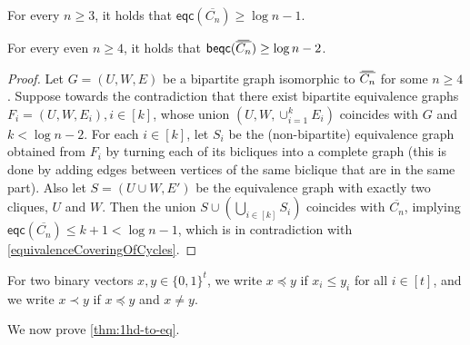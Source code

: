 \documentclass{theoretics}
\newcommand{\eqc}{\mathsf{eqc}}
\newcommand{\beqc}{\mathsf{beqc}}
\newcommand\doverline[1]{%
  \setbox0=\hbox{$\!\overline{#1}\!$}%
  \ht0=\dimexpr\ht0-.2ex\relax%
  \,\overline{\copy0}\,%
}
\newcommand{\bc}[1]{\doverline{#1}} %
\begin{document}
\begin{theorem}\label{equivalenceCoveringOfCycles}
	For every $n \geq 3$, it holds that $\eqc(\overline{C_n}) \geq \log n - 1$.
\end{theorem}

\begin{corollary}\label{bipEquivalenceCoveringOfCycles}
	For every even $n \geq 4$, it holds that $\beqc(\bc{C_n}) \geq \log n -2$.
\end{corollary}
\begin{proof}
	Let $G=(U,W,E)$ be a bipartite graph isomorphic to $\bc{C_n}$ for some $n \geq 4$.
  Suppose towards the contradiction that there exist bipartite equivalence graphs $F_i=(U,W,E_i), i
\in [k]$, whose union $(U,W, \cup_{i=1}^k E_i)$ coincides with $G$ and $k < \log n - 2$. For each $i
\in [k]$, let $S_i$ be the (non-bipartite) equivalence graph obtained from $F_i$ by turning each of its bicliques
into a complete graph (this is done by adding edges between vertices of the same biclique that are
in the same part). Also let $S=(U \cup W, E')$ be the equivalence graph with exactly two cliques,
$U$ and $W$.  Then the union $S \cup \left(\bigcup_{i \in [k]} S_i\right)$ coincides with $\overline{C_n}$,
implying $\eqc(\overline{C_n}) \leq k +1 < \log n - 1$, which is in contradiction with
\cref{equivalenceCoveringOfCycles}.
\end{proof}

For two binary vectors $x,y \in \{0,1\}^t$, we write $x \preceq y$ if $x_i \leq y_i$ for all $i \in [t]$, and we write $x \prec y$ if $x \preceq y$ and $x \neq y$.

We now prove \cref{thm:1hd-to-eq}.
\end{document}
